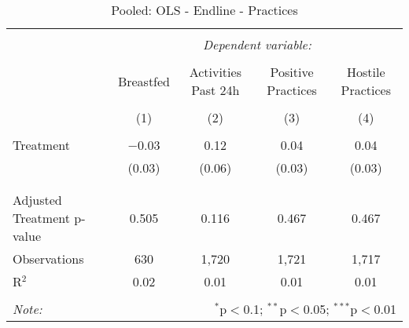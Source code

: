 
\begin{table}[!htbp] \centering 
  \caption{Pooled: OLS - Endline - Practices} 
  \label{tbl:Pooled: OLS - Endline - Practices} 
\begin{tabular}{@{\extracolsep{5pt}}lcccc} 
\\[-1.8ex]\hline 
\hline \\[-1.8ex] 
 & \multicolumn{4}{c}{\textit{Dependent variable:}} \\ 
\cline{2-5} 
\\[-1.8ex] & Breastfed & Activities Past 24h & Positive Practices & Hostile Practices \\ 
\\[-1.8ex] & (1) & (2) & (3) & (4)\\ 
\hline \\[-1.8ex] 
 Treatment & $-$0.03 & 0.12 & 0.04 & 0.04 \\ 
  & (0.03) & (0.06) & (0.03) & (0.03) \\ 
  & & & & \\ 
\hline \\[-1.8ex] 
Adjusted Treatment p-value & 0.505 & 0.116 & 0.467 & 0.467 \\ 
Observations & 630 & 1,720 & 1,721 & 1,717 \\ 
R$^{2}$ & 0.02 & 0.01 & 0.01 & 0.01 \\ 
\hline 
\hline \\[-1.8ex] 
\textit{Note:}  & \multicolumn{4}{r}{$^{*}$p$<$0.1; $^{**}$p$<$0.05; $^{***}$p$<$0.01} \\ 
\end{tabular} 
\end{table} 
